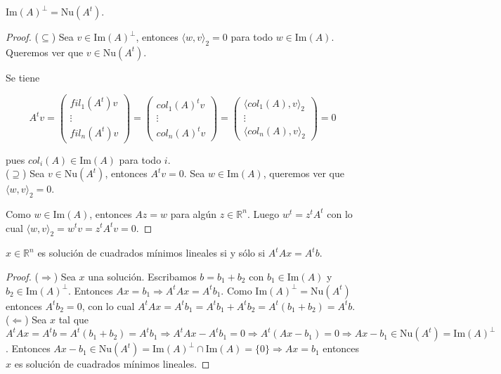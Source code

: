\begin{lema}
$\text{Im}(A)^{\perp} = \text{Nu}(A^t)$.

\begin{proof}
($\subseteq$) Sea $v \in \text{Im}(A)^{\perp}$, entonces $\langle w, v \rangle_2 = 0$ para todo $w \in \text{Im}(A)$. Queremos ver que $v \in \text{Nu}(A^t)$.

Se tiene

\[A^tv = \begin{pmatrix}
fil_1(A^t)v\\
\vdots\\
fil_n(A^t) v
\end{pmatrix} = \begin{pmatrix}
col_1(A)^t v\\
\vdots\\
col_n(A)^t v
\end{pmatrix} = \begin{pmatrix}
\langle col_1(A), v \rangle_2\\
\vdots\\
\langle col_n(A), v \rangle_2
\end{pmatrix} = 0\]

pues $col_i(A) \in \text{Im}(A)$ para todo $i$.\\[0.25cm]

($\supseteq$) Sea $v \in \text{Nu}(A^t)$, entonces $A^tv = 0$. Sea $w \in \text{Im}(A)$, queremos ver que $\langle w, v \rangle_2 = 0$.

Como $w \in \text{Im}(A)$, entonces $Az = w$ para algún $z \in \mathbb{R}^n$. Luego $w^t = z^tA^t$ con lo cual $\langle w, v \rangle_2 = w^tv = z^tA^tv = 0$.
\end{proof}
\end{lema}

\begin{propo}
$x \in \mathbb{R}^{n}$ es solución de cuadrados mínimos lineales si y sólo si $A^tAx = A^tb$.

\begin{proof}
($\Rightarrow$) Sea $x$ una solución. Escribamos $b = b_1 + b_2$ con $b_1 \in \text{Im}(A)$ y $b_2 \in \text{Im}(A)^{\perp}$. Entonces $Ax = b_1 \Rightarrow A^tAx = A^tb_1$. Como $\text{Im}(A)^{\perp} = \text{Nu}(A^t)$ entonces $A^tb_2 = 0$, con lo cual $A^tAx = A^tb_1 = A^tb_1 + A^tb_2 = A^t(b_1 + b_2) = A^tb$.\\[0.25cm]

($\Leftarrow$) Sea $x$ tal que $A^tAx = A^tb = A^t(b_1 + b_2) = A^tb_1 \Rightarrow A^tAx - A^tb_1 = 0 \Rightarrow A^t(Ax - b_1) = 0 \Rightarrow Ax - b_1 \in \text{Nu}(A^t) = \text{Im}(A)^{\perp}$. Entonces $Ax - b_1 \in \text{Nu}(A^t) = \text{Im}(A)^{\perp} \cap \text{Im}(A) = \{0\} \Rightarrow Ax = b_1$ entonces $x$ es solución de cuadrados mínimos lineales.
\end{proof}
\end{propo}

